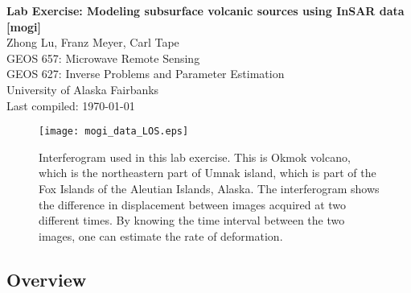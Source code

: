 \documentclass[11pt,titlepage,fleqn]{article}
\begin{document}

\begin{spacing}{1.2}
\centering
{\large \bf Lab Exercise: Modeling subsurface volcanic sources using InSAR data [mogi]} \\
Zhong Lu, Franz Meyer, Carl Tape %
\\
GEOS 657: Microwave Remote Sensing \\
GEOS 627: Inverse Problems and Parameter Estimation \\
University of Alaska Fairbanks \\
Last compiled: \today
\end{spacing}


\begin{figure}[h]
\centering
\texttt{[image: mogi\_data\_LOS.eps]}
\caption[]
{{
Interferogram used in this lab exercise. This is Okmok volcano, which is the northeastern part of Umnak island, which is part of the Fox Islands of the Aleutian Islands, Alaska. The interferogram shows the difference in displacement between images acquired at two different times. By knowing the time interval between the two images, one can estimate the rate of deformation.
\label{data}
}}
\end{figure}


\subsection*{Overview}
\end{document}
